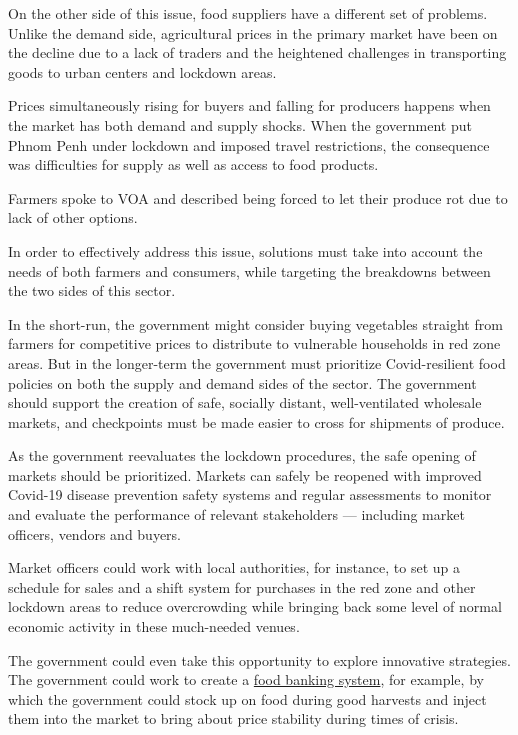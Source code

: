 \documentclass[10pt,a4paper]{letter}
\begin{document}
On the other side of this issue, food suppliers have a different set of problems. Unlike the demand side, agricultural prices in the primary market have been on the decline due to a lack of traders and the heightened challenges in transporting goods to urban centers and lockdown areas.

Prices simultaneously rising for buyers and falling for producers happens when the market has both demand and supply shocks. When the government put Phnom Penh under lockdown and imposed travel restrictions, the consequence was difficulties for supply as well as access to food products.

Farmers spoke to VOA and described being forced to let their produce rot due to lack of other options.

In order to effectively address this issue, solutions must take into account the needs of both farmers and consumers, while targeting the breakdowns between the two sides of this sector.

In the short-run, the government might consider buying vegetables straight from farmers for competitive prices to distribute to vulnerable households in red zone areas. But in the longer-term the government must prioritize Covid-resilient food policies on both the supply and demand sides of the sector. The government should support the creation of safe, socially distant, well-ventilated wholesale markets, and checkpoints must be made easier to cross for shipments of produce.

As the government reevaluates the lockdown procedures, the safe opening of markets should be prioritized. Markets can safely be reopened with improved Covid-19 disease prevention safety systems and regular assessments to monitor and evaluate the performance of relevant stakeholders --- including market officers, vendors and buyers.

Market officers could work with local authorities, for instance, to set up a schedule for sales and a shift system for purchases in the red zone and other lockdown areas to reduce overcrowding while bringing back some level of normal economic activity in these much-needed venues.  

The government could even take this opportunity to explore innovative strategies. The government could work to create a \href{https://www.foodbanking.org/why-we-exist/}{food banking system}, for example, by which the government could stock up on food during good harvests and inject them into the market to bring about price stability during times of crisis.
\end{document}
